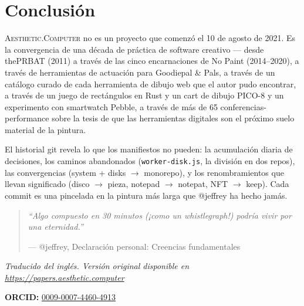 \documentclass[10pt,letterpaper,twocolumn]{article}
\newcommand{\ac}{\textsc{Aesthetic.Computer}}
\begin{document}
\section{Conclusión}

\ac{} no es un proyecto que comenzó el 10 de agosto de 2021. Es la convergencia de una década de práctica de software creativo --- desde thePRBAT (2011) a través de las cinco encarnaciones de No Paint (2014--2020), a través de herramientas de actuación para Goodiepal \& Pals, a través de un catálogo curado de cada herramienta de dibujo web que el autor pudo encontrar, a través de un juego de rectángulos en Rust y un cart de dibujo PICO-8 y un experimento con smartwatch Pebble, a través de más de 65 conferencias-performance sobre la tesis de que las herramientas digitales son el próximo suelo material de la pintura.

El historial git revela lo que los manifiestos no pueden: la acumulación diaria de decisiones, los caminos abandonados (\texttt{worker-disk.js}, la división en dos repos), las convergencias (system + disks $\rightarrow$ monorepo), y los renombramientos que llevan significado (disco $\rightarrow$ pieza, notepad $\rightarrow$ notepat, NFT $\rightarrow$ keep). Cada commit es una pincelada en la pintura más larga que @jeffrey ha hecho jamás.

\begin{quote}
\emph{``Algo compuesto en 30 minutos (¡como un whistlegraph!) podría vivir por una eternidad.''}

--- @jeffrey, Declaración personal: Creencias fundamentales
\end{quote}

\vspace{0.5em}
\noindent\textit{Traducido del inglés. Versión original disponible en \url{https://papers.aesthetic.computer}}

\vspace{0.5em}
\noindent\textbf{ORCID:} \href{https://orcid.org/0009-0007-4460-4913}{0009-0007-4460-4913}



\end{document}
